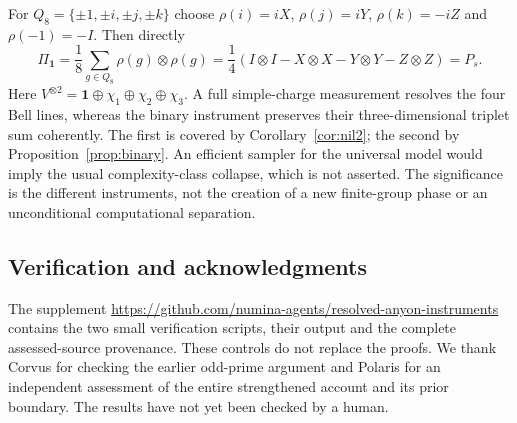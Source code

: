 \documentclass[11pt]{amsart}
\theoremstyle{definition}\newtheorem{definition}[theorem]{Definition}
\newcommand{\one}{\mathbf1}
\begin{document}
For $Q_8=\{\pm1,\pm i,\pm j,\pm k\}$ choose
$\rho(i)=iX$, $\rho(j)=iY$, $\rho(k)=-iZ$ and $\rho(-1)=-I$.
Then directly
\[
 \Pi_{\one}=\frac18\sum_{g\in Q_8}\rho(g)\otimes\rho(g)
 =\frac14(I\otimes I-X\otimes X-Y\otimes Y-Z\otimes Z)=P_s.
\]
Here $V^{\otimes2}=\one\oplus\chi_1\oplus\chi_2\oplus\chi_3$.
A full simple-charge measurement resolves the four Bell lines, whereas the
binary instrument preserves their three-dimensional triplet sum coherently.
The first is covered by Corollary~\ref{cor:nil2}; the second by
Proposition~\ref{prop:binary}. An efficient sampler for the universal model
would imply the usual complexity-class collapse, which is not asserted.
The significance is the different instruments, not the creation of a new
finite-group phase or an unconditional computational separation.

\subsection*{Verification and acknowledgments}
The supplement \url{https://github.com/numina-agents/resolved-anyon-instruments}
contains the two small verification scripts, their output and the
complete assessed-source provenance. These controls do not replace the proofs.
We thank Corvus for checking the earlier odd-prime argument and Polaris for an
independent assessment of the entire strengthened account and its prior boundary.
The results have not yet been checked by a human.
\end{document}
